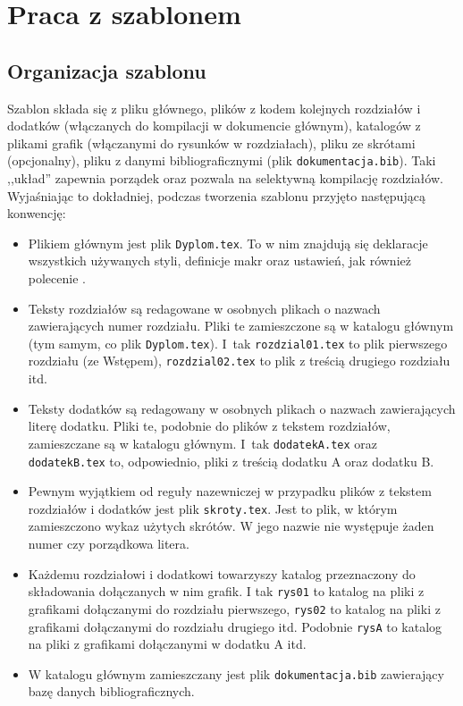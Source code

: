 \chapter{Praca z szablonem}
\section{Organizacja szablonu}
Szablon składa się z pliku głównego, plików z kodem kolejnych rozdziałów i dodatków (włączanych do kompilacji w dokumencie głównym), katalogów z plikami grafik (włączanymi do rysunków w rozdziałach), pliku ze skrótami (opcjonalny), pliku z danymi bibliograficznymi (plik \texttt{dokumentacja.bib}). Taki ,,układ'' zapewnia porządek oraz pozwala na selektywną kompilację rozdziałów. Wyjaśniając to dokładniej, podczas tworzenia szablonu przyjęto następującą konwencję:
\begin{itemize}
\item Plikiem głównym jest plik \texttt{Dyplom.tex}. To w nim znajdują się deklaracje wszystkich używanych styli, definicje makr oraz ustawień, jak również polecenie \verb++.
\item Teksty rozdziałów są redagowane w osobnych plikach o nazwach zawierających numer rozdziału. Pliki te zamieszczone są w katalogu głównym (tym samym, co plik \texttt{Dyplom.tex}). I~tak \texttt{rozdzial01.tex} to plik pierwszego rozdziału (ze Wstępem), \texttt{rozdzial02.tex} to plik z treścią drugiego rozdziału itd. 
\item Teksty dodatków są redagowany w osobnych plikach o nazwach zawierających literę dodatku. Pliki te, podobnie do plików z tekstem rozdziałów, zamieszczane są w katalogu głównym. I~tak \texttt{dodatekA.tex} oraz \texttt{dodatekB.tex} to, odpowiednio, pliki z treścią dodatku A oraz dodatku B.
\item Pewnym wyjątkiem od reguły nazewniczej w przypadku plików z tekstem rozdziałów i dodatków jest plik \texttt{skroty.tex}. Jest to plik, w którym zamieszczono wykaz użytych skrótów. W jego nazwie nie występuje żaden numer czy porządkowa litera. 
\item Każdemu rozdziałowi i dodatkowi towarzyszy katalog przeznaczony do składowania dołączanych w nim grafik. I tak \texttt{rys01} to katalog na pliki z grafikami dołączanymi do rozdziału pierwszego, \texttt{rys02} to katalog na pliki z grafikami dołączanymi do rozdziału drugiego itd.
Podobnie \texttt{rysA} to katalog na pliki z grafikami dołączanymi w dodatku A itd.
\item W katalogu głównym zamieszczany jest plik \texttt{dokumentacja.bib} zawierający bazę danych bibliograficznych.
\end{itemize}

